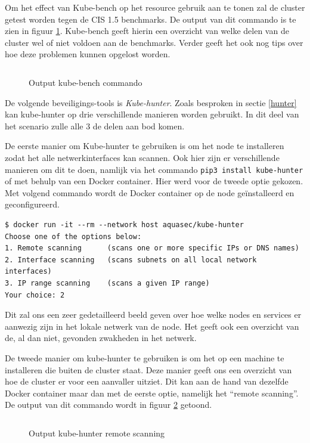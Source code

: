 Om het effect van Kube-bench op het resource gebruik aan te tonen zal de cluster getest worden tegen de CIS 1.5 benchmarks. De output van dit commando is te zien in figuur \ref{benchOut}. Kube-bench geeft hierin een overzicht van welke delen van de cluster wel of niet voldoen aan de benchmarks. Verder geeft het ook nog tips over hoe deze problemen kunnen opgelost worden.

\begin{figure}[h] 
	\centering
	\inputminted[fontsize=\footnotesize,linenos]{bash}{files/benchOutput.txt}
	\caption{Output kube-bench commando}
	\label{benchOut}
\end{figure}

De volgende beveiligings-tools is \textit{Kube-hunter}. Zoals besproken in sectie \ref{hunter} kan kube-hunter op drie verschillende manieren worden gebruikt. In dit deel van het scenario zulle alle 3 de delen aan bod komen.

De eerste manier om Kube-hunter te gebruiken is om het node te installeren zodat het alle netwerkinterfaces kan scannen. Ook hier zijn er verschillende manieren om dit te doen, namlijk via het commando \verb|pip3 install kube-hunter| of met behulp van een Docker container. Hier werd voor de tweede optie gekozen. Met volgend commando wordt de Docker container op de node geïnstalleerd en geconfigureerd.
\begin{verbatim} 
$ docker run -it --rm --network host aquasec/kube-hunter
Choose one of the options below:
1. Remote scanning      (scans one or more specific IPs or DNS names)
2. Interface scanning   (scans subnets on all local network interfaces)
3. IP range scanning    (scans a given IP range)
Your choice: 2
\end{verbatim}
Dit zal ons een zeer gedetailleerd beeld geven over hoe welke nodes en services er aanwezig zijn in het lokale netwerk van de node. Het geeft ook een overzicht van de, al dan niet, gevonden zwakheden in het netwerk.

De tweede manier om kube-hunter te gebruiken is om het op een machine te installeren die buiten de cluster staat. Deze manier geeft ons een overzicht van hoe de cluster er voor een aanvaller uitziet. Dit kan aan de hand van dezelfde Docker container maar dan met de eerste optie, namelijk het ``remote scanning''. De output van dit commando wordt in figuur \ref{remoteHunt} getoond.

\begin{figure}[h] 
	\centering
	\inputminted[fontsize=\footnotesize,linenos]{bash}{files/hunterRemoteOutput.txt}
	\caption{Output kube-hunter remote scanning}
	\label{remoteHunt}
\end{figure}


